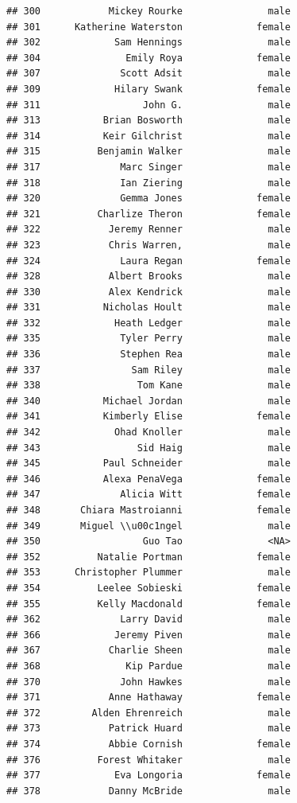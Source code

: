 \documentclass[
]{article}
\begin{document}
\begin{verbatim}
## 300            Mickey Rourke               male
## 301      Katherine Waterston             female
## 302             Sam Hennings               male
## 304               Emily Roya             female
## 307              Scott Adsit               male
## 309             Hilary Swank             female
## 311                  John G.               male
## 313           Brian Bosworth               male
## 314           Keir Gilchrist               male
## 315          Benjamin Walker               male
## 317              Marc Singer               male
## 318              Ian Ziering               male
## 320              Gemma Jones             female
## 321          Charlize Theron             female
## 322            Jeremy Renner               male
## 323            Chris Warren,               male
## 324              Laura Regan             female
## 328            Albert Brooks               male
## 330            Alex Kendrick               male
## 331           Nicholas Hoult               male
## 332             Heath Ledger               male
## 335              Tyler Perry               male
## 336              Stephen Rea               male
## 337                Sam Riley               male
## 338                 Tom Kane               male
## 340           Michael Jordan               male
## 341           Kimberly Elise             female
## 342             Ohad Knoller               male
## 343                 Sid Haig               male
## 345           Paul Schneider               male
## 346           Alexa PenaVega             female
## 347              Alicia Witt             female
## 348       Chiara Mastroianni             female
## 349       Miguel \\u00c1ngel               male
## 350                  Guo Tao               <NA>
## 352          Natalie Portman             female
## 353      Christopher Plummer               male
## 354          Leelee Sobieski             female
## 355          Kelly Macdonald             female
## 362              Larry David               male
## 366             Jeremy Piven               male
## 367            Charlie Sheen               male
## 368               Kip Pardue               male
## 370              John Hawkes               male
## 371            Anne Hathaway             female
## 372         Alden Ehrenreich               male
## 373            Patrick Huard               male
## 374            Abbie Cornish             female
## 376          Forest Whitaker               male
## 377             Eva Longoria             female
## 378            Danny McBride               male

\end{verbatim}
\end{document}
